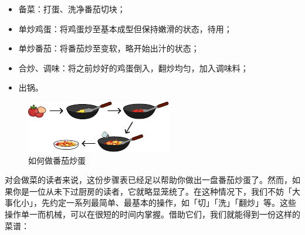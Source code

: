 \begin{itemize}
  \item 备菜：打蛋、洗净番茄切块；
  \item 单炒鸡蛋：将鸡蛋炒至基本成型但保持嫩滑的状态，待用；
  \item 单炒番茄：将番茄炒至变软，略开始出汁的状态；
  \item 合炒、调味：将之前炒好的鸡蛋倒入，翻炒均匀，加入调味料；
  \item 出锅。
\end{itemize}

\begin{figure}[htb!]
  \centering
  \includegraphics[width=.65\textwidth]{assets/surpass/Tomato_egg.pdf}
  \caption{如何做番茄炒蛋}
  \label{fig:Tomato_egg}
\end{figure}

对会做菜的读者来说，这份步骤表已经足以帮助你做出一盘番茄炒蛋了。然而，如果你是一位从未下过厨房的读者，它就略显笼统了。在这种情况下，我们不妨「大事化小」，先约定一系列最简单、最基本的操作，如「切」「洗」「翻炒」等。这些操作单一而机械，可以在很短的时间内掌握。借助它们，我们就能得到一份这样的菜谱：

